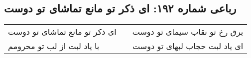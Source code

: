 \begin{center}
\section*{رباعی شماره ۱۹۲: ای ذکر تو مانع تماشای تو دوست}
\label{sec:0192}
\begin{longtable}{l p{0.5cm} r}
ای ذکر تو مانع تماشای تو دوست
&&
برق رخ تو نقاب سیمای تو دوست
\\
با یاد لبت از لب تو محرومم
&&
ای یاد لبت حجاب لبهای تو دوست
\\
\end{longtable}
\end{center}
